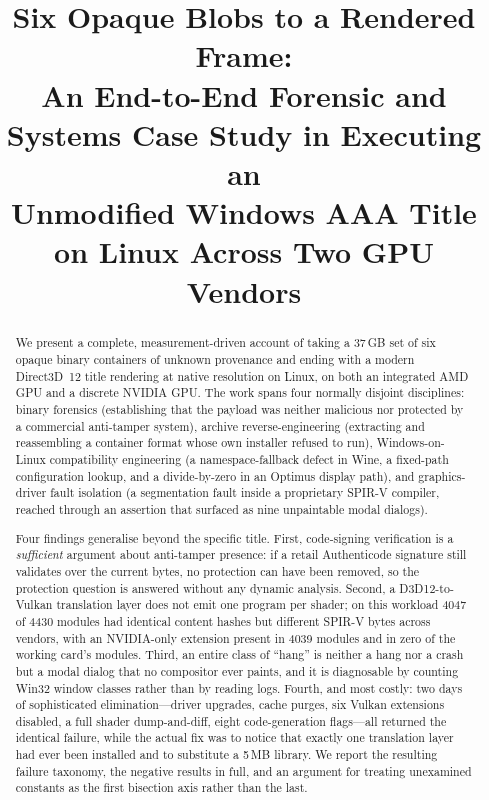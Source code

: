\documentclass[conference,10pt]{IEEEtran}
\begin{document}
\title{Six Opaque Blobs to a Rendered Frame:\\
An End-to-End Forensic and Systems Case Study in Executing an\\
Unmodified Windows AAA Title on Linux Across Two GPU Vendors}

\author{
}

\maketitle

\begin{abstract}
We present a complete, measurement-driven account of taking a 37\,GB set of six
opaque binary containers of unknown provenance and ending with a modern
Direct3D~12 title rendering at native resolution on Linux, on both an integrated
AMD GPU and a discrete NVIDIA GPU. The work spans four normally disjoint
disciplines: binary forensics (establishing that the payload was neither
malicious nor protected by a commercial anti-tamper system), archive
reverse-engineering (extracting and reassembling a container format whose own
installer refused to run), Windows-on-Linux compatibility engineering (a
namespace-fallback defect in Wine, a fixed-path configuration lookup, and a
divide-by-zero in an Optimus display path), and graphics-driver fault isolation
(a segmentation fault inside a proprietary SPIR-V compiler, reached through an
assertion that surfaced as nine unpaintable modal dialogs).

Four findings generalise beyond the specific title. First, code-signing
verification is a \emph{sufficient} argument about anti-tamper presence: if a
retail Authenticode signature still validates over the current bytes, no
protection can have been removed, so the protection question is answered without
any dynamic analysis. Second, a D3D12-to-Vulkan translation layer does not emit
one program per shader; on this workload 4047 of 4430 modules had identical
content hashes but different SPIR-V bytes across vendors, with an NVIDIA-only
extension present in 4039 modules and in zero of the working card's modules.
Third, an entire class of ``hang'' is neither a hang nor a crash but a modal
dialog that no compositor ever paints, and it is diagnosable by counting Win32
window classes rather than by reading logs. Fourth, and most costly: two days of
sophisticated elimination---driver upgrades, cache purges, six Vulkan extensions
disabled, a full shader dump-and-diff, eight code-generation flags---all returned
the identical failure, while the actual fix was to notice that exactly one
translation layer had ever been installed and to substitute a 5\,MB library.
We report the resulting failure taxonomy, the negative results in full, and an
argument for treating unexamined constants as the first bisection axis rather
than the last.
\end{abstract}
\end{document}
